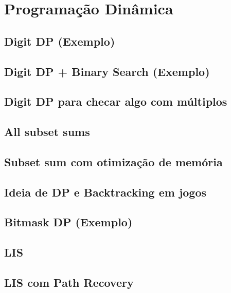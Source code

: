 \section{Programação Dinâmica}

\subsection{Digit DP (Exemplo)}


\subsection{Digit DP + Binary Search (Exemplo)}


\subsection{Digit DP para checar algo com múltiplos}


\subsection{All subset sums}


\subsection{Subset sum com otimização de memória}


\subsection{Ideia de DP e Backtracking em jogos}


\subsection{Bitmask DP (Exemplo)}


\subsection{LIS}


\subsection{LIS com Path Recovery}
